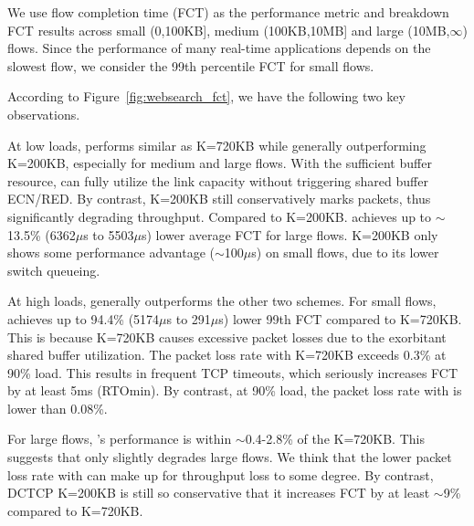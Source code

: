 \vspace{-2mm}
We use flow completion time (FCT) as the performance metric and breakdown FCT results across small (0,100KB], medium (100KB,10MB] and large (10MB,$\infty$) flows. Since the performance of many real-time applications depends on the slowest flow, we consider the 99th percentile FCT for small flows.

\vspace{-1mm}
According to Figure~\ref{fig:websearch_fct}, we have the following two key observations.
\begin{ecompact}
\vspace{-1mm}
\item At low loads, \sys performs similar as K=720KB while generally outperforming K=200KB, especially for medium and large flows. With the sufficient buffer resource, \sys can fully utilize the link capacity without triggering shared buffer ECN/RED. By contrast, K=200KB still conservatively marks packets, thus significantly degrading throughput. Compared to K=200KB. \sys achieves up to $\sim$13.5\% (6362$\mu$s to 5503$\mu$s) lower average FCT for large flows. K=200KB only shows some performance advantage ($\sim$100$\mu$s) on small flows, due to its lower switch queueing.
\vspace{-1mm}
\item At high loads, \sys generally outperforms the other two schemes. For small flows, \sys achieves up to  94.4\% (5174$\mu$s to 291$\mu$s) lower 99th FCT compared to K=720KB. This is because K=720KB causes excessive packet losses due to the exorbitant shared buffer utilization. The packet loss rate with K=720KB exceeds 0.3\% at 90\% load. This results in frequent TCP timeouts, which seriously increases FCT by at least 5ms (RTOmin). By contrast, at 90\% load, the packet loss rate with \sys is lower than 0.08\%.

    For large flows, \sys's performance is within $\sim$0.4-2.8\% of the K=720KB. This suggests that \sys only slightly degrades large flows. We think that the lower packet loss rate with \sys can make up for throughput loss to some degree. By contrast, DCTCP K=200KB is still so conservative that it increases FCT by at least $\sim$9\% compared to K=720KB.
\end{ecompact}


